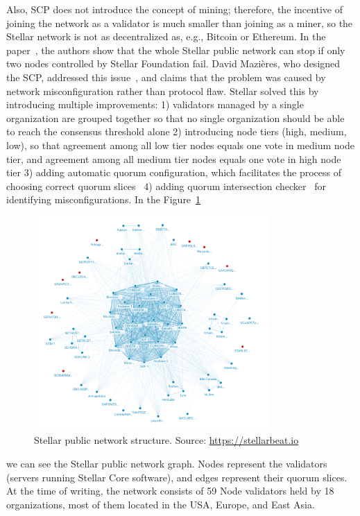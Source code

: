 \documentclass[applsci,article,submit,moreauthors,pdftex]{Definitions/mdpi}
\begin{document}
Also, SCP does not introduce the concept of mining; therefore, the incentive of joining the network as a validator is much smaller than joining as a miner, so the Stellar network is not as decentralized as, e.g., Bitcoin or Ethereum. In the paper~\cite{kim2019Stellar}, the authors show that the whole Stellar public network can stop if only two nodes controlled by Stellar Foundation fail. David Mazières, who designed the SCP, addressed this issue~\cite{Safetyvs90:online}, and claims that the problem was caused by network misconfiguration rather than protocol flaw. Stellar solved this by introducing multiple improvements: 1) validators managed by a single organization are grouped together so that no single organization should be able to reach the consensus threshold alone 2) introducing node tiers (high, medium, low), so that agreement among all low tier nodes equals one vote in medium node tier, and agreement among all medium tier nodes equals one vote in high node tier 3) adding automatic quorum configuration, which facilitates the process of choosing correct quorum slices~\cite{WhyQuoru96:online} 4) adding quorum intersection checker~\cite{DBLP:journals/corr/abs-1902-06493} for identifying misconfigurations. In the Figure~\ref{fig:network-viz} 
\begin{figure}[h!]
\includegraphics[width=9cm]{figs/Stellar-network-viz.png}
\centering
\caption{Stellar public network structure. Source: \url{https://stellarbeat.io}}
\label{fig:network-viz}
\end{figure} 
we can see the Stellar public network graph. Nodes represent the validators (servers running Stellar Core software), and edges represent their quorum slices. At the time of writing, the network consists of 59 Node validators held by 18 organizations, most of them located in the USA, Europe, and East Asia.
\end{document}
